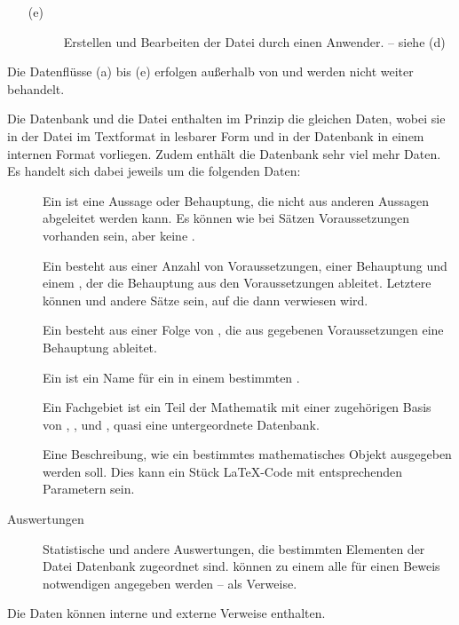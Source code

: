 \begin{itemize}
	\item[(e)] \label{dat:TerminalDatei}
	\begin{description}
		\item[]\label{dat:Terminal22Datei}
		Erstellen und Bearbeiten der Datei durch einen Anwender.
		-- siehe (d)
	\end{description}
	
\end{itemize}
Die Datenflüsse (a) bis (e) erfolgen außerhalb von \ASBA
und werden nicht weiter behandelt.

Die Datenbank und die Datei enthalten im Prinzip die gleichen Daten, wobei sie in der Datei im Textformat in lesbarer Form und in der Datenbank in einem internen Format vorliegen.
Zudem enthält die Datenbank \textiAlg sehr viel mehr Daten. Es handelt sich dabei jeweils um die folgenden Daten:
\begin{description}
	
	\item[]         \label{Daten:Axiom}
	Ein  ist eine Aussage oder Behauptung, die nicht aus anderen Aussagen abgeleitet werden kann.
	Es können wie bei Sätzen Voraussetzungen vorhanden sein, aber keine .
	
	\item[]          \label{Daten:Satz}
	Ein  besteht aus einer Anzahl von Voraussetzungen, einer Behauptung und einem , der die Behauptung aus den Voraussetzungen ableitet.
	Letztere können  und andere Sätze sein, auf die dann verwiesen wird.
	
	\item[]        \label{Daten:Beweis}
	Ein  besteht aus einer Folge von , die aus gegebenen Voraussetzungen eine Behauptung ableitet.
	
	\item[]   \label{Daten:Fachbegriff}
	Ein  ist ein Name für ein  in einem bestimmten .
	
	\item[]    \label{Daten:Fachgebiet}
	Ein Fachgebiet ist ein Teil der Mathematik mit einer zugehörigen Basis von , ,  und , quasi eine untergeordnete Datenbank.
	
	\item[] \label{Daten:Ausgabeschema}
	Eine Beschreibung, wie ein bestimmtes mathematisches Objekt ausgegeben werden soll.
	Dies kann \textzB ein Stück \LaTeX-Code mit entsprechenden Parametern sein.
	
	\item[Auswertungen]             \label{Daten:Auswertung}
	Statistische und andere Auswertungen, die bestimmten Elementen der Datei \textbzw Datenbank zugeordnet sind.
	\textZB können zu einem  alle für einen Beweis notwendigen  angegeben werden -- als Verweise.
	
\end{description}
Die Daten können interne und externe Verweise enthalten.

\Endchapter
